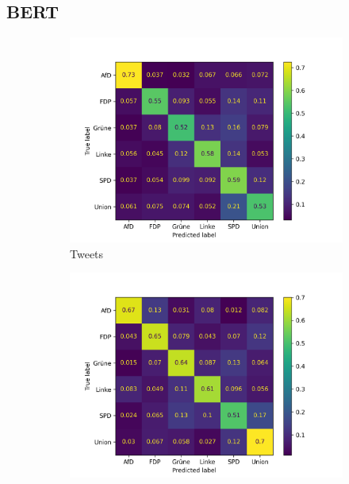 \subsection*{BERT}

\begin{figure}[H]
    \centering
    \begin{subfigure}{0.49\textwidth}
      \includegraphics[width=\textwidth]{data/images/modeling/bert/none/tweets_confusion_matrix.png}
      \caption{Tweets} \label{sfig:confusionMatrixBertTweetsUnbalanced}
    \end{subfigure}
    \hfill
    \begin{subfigure}{0.49\textwidth}
      \includegraphics[width=\textwidth]{data/images/modeling/bert/none/party_programs_confusion_matrix.png}

\end{subfigure}
\end{figure}
